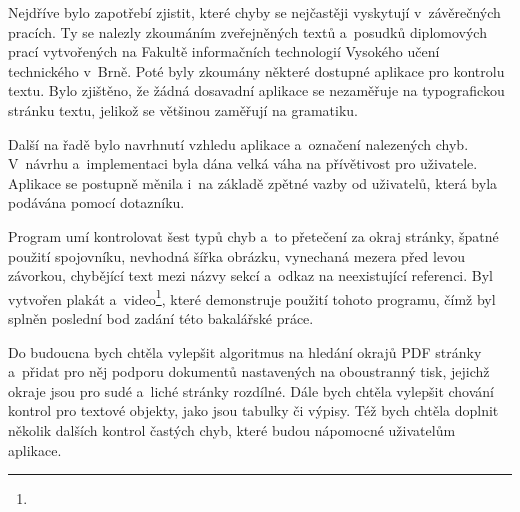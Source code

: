 Nejdříve bylo zapotřebí zjistit, které chyby se nejčastěji vyskytují v~závěrečných
pracích. Ty se nalezly zkoumáním zveřejněných textů a~posudků diplomových prací
vytvořených na Fakultě informačních technologií Vysokého učení technického v~Brně.
Poté byly zkoumány některé dostupné aplikace pro kontrolu textu. Bylo zjištěno,
že žádná dosavadní aplikace se nezaměřuje na typografickou stránku textu, jelikož
se většinou zaměřují na gramatiku.

Další na řadě bylo navrhnutí vzhledu aplikace a~označení nalezených chyb.
V~návrhu a~implementaci byla dána velká váha na přívětivost pro uživatele.
Aplikace se postupně měnila i~na základě zpětné vazby od uživatelů, která byla
podávána pomocí dotazníku.

Program umí kontrolovat šest typů chyb a~to přetečení za okraj stránky, 
špatné použití spojovníku, nevhodná šířka obrázku, vynechaná mezera před levou
závorkou, chybějící text mezi názvy sekcí a~odkaz na neexistující referenci.
Byl vytvořen plakát a~video\footnote{}, které
demonstruje použití tohoto programu, čímž byl splněn poslední bod zadání této
bakalářské práce.

Do budoucna bych chtěla vylepšit algoritmus na hledání okrajů PDF stránky
a~přidat pro něj podporu dokumentů nastavených na oboustranný tisk, jejichž
okraje jsou pro sudé a~liché stránky rozdílné. Dále bych chtěla vylepšit chování
kontrol pro textové objekty, jako jsou tabulky či výpisy. Též bych chtěla doplnit
několik dalších kontrol častých chyb, které budou nápomocné uživatelům aplikace.











%
